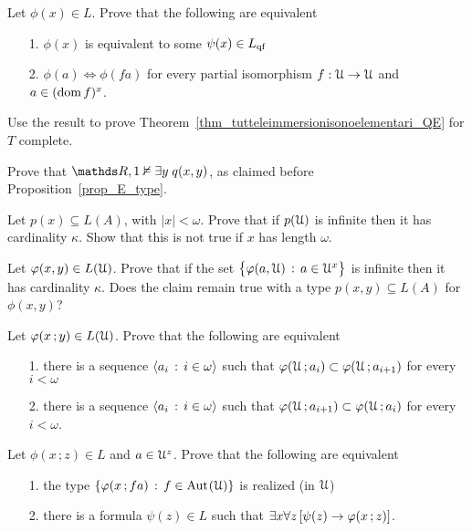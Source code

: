 \begin{exercise}\label{ex_qe_in_U}
  Let $\phi(x)\in L$. Prove that the following are equivalent
  \begin{itemize}
   \item[1.] $\phi(x)$ is equivalent to some $\psi(x)\in L_{\rm qf}$
   \item[2.] $\phi(a)\iff\phi(fa)$ for every partial isomorphism $f:\EuScript U\to\EuScript U$ and $a\in(\mathop{\rm dom} f)^x$.
  \end{itemize}
  Use the result to prove Theorem~\ref{thm_tutteleimmersionisonoelementari_QE} for $T$ complete.
\end{exercise}

\begin{exercise}\label{ex_E_type}
  Prove that $\RR,1\notmodels\E y\;q(x,y)$, as claimed before Proposition~\ref{prop_E_type}.
\end{exercise}

\begin{exercise}\label{cadinalitafinitasaturazione}
  Let $p(x)\subseteq L(A)$, with $|x|<\omega$. 
  Prove that if $p(\EuScript U)$ is infinite then it has cardinality $\kappa$. 
  Show that this is not true if $x$ has length $\omega$. 
\end{exercise}

\begin{exercise}\label{cadinalitafinitasaturazioneinsiemi}
  Let $\varphi(x,y)\in L(\EuScript U)$. Prove that if the set $\big\{\varphi(a,\EuScript U)\, :\, a\in\EuScript U^x\big\}$ is infinite then it has cardinality $\kappa$.
  Does the claim remain true with a type $p(x,y)\subseteq L(A)$ for $\phi(x,y)$?
\end{exercise}

\begin{exercise}\label{ex_saturazione_catene_insiemi}
  Let $\varphi(x\,;y)\in L(\EuScript U)$.
  Prove that the following are equivalent
  \begin{itemize}
  \item[1.] there is a sequence $\langle a_i\,:\,i\in\omega\rangle$ such that $\varphi(\EuScript U\,;a_i)\subset\varphi(\EuScript U\,;a_{i+1})$ for every $i<\omega$
  \item[2.] there is a sequence $\langle a_i\,:\,i\in\omega\rangle$ such that $\varphi(\EuScript U\,;a_{i+1})\subset\varphi(\EuScript U\,;a_i)$ for every $i<\omega$.
  \end{itemize}
\end{exercise}

\begin{exercise}\label{ex_ak_definibilita}
  Let $\phi(x\,;z)\in L$ and $a\in\EuScript U^z$.
  Prove that the following are equivalent
  \begin{itemize}
  \item[1.] the type $\{\varphi(x\,;fa)\,:\,f\in{\rm Aut\kern.15ex}(\EuScript U)\}$ is realized (in $\EuScript U$)
  \item[2.] there is a formula $\psi(z)\in L$ such that $\exists x\forall z\,[\psi(z)\rightarrow\varphi(x\,;z)]$.
  \end{itemize}  
\end{exercise}

